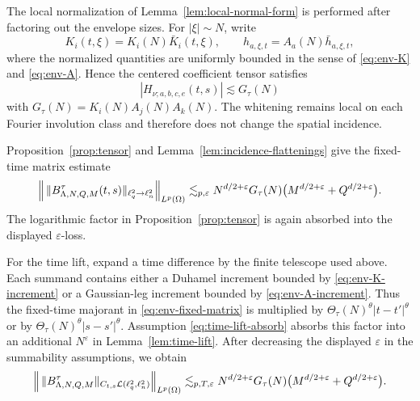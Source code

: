 \documentclass[11pt,reqno]{amsart}
\numberwithin{equation}{section}
\theoremstyle{plain}
\theoremstyle{definition}
\newcommand{\cL}{\mathcal L}
\newcommand{\eps}{\varepsilon}
\begin{document}
The local normalization of Lemma~\ref{lem:local-normal-form} is performed
after factoring out the envelope sizes.  For \(|\xi|\sim N\), write
\[
        K_i(t,\xi)=K_i(N)\bar K_i(t,\xi),
        \qquad
        h_{a,\xi,t}=A_a(N)\bar h_{a,\xi,t},
\]
where the normalized quantities are uniformly bounded in the sense of \eqref{eq:env-K} and \eqref{eq:env-A}.  Hence the centered coefficient tensor satisfies
\begin{equation}\label{eq:env-H-bound}
        |H_{\nu;a,b,c,e}(t,s)|
        \lesssim G_\tau(N)
\end{equation}
with \(G_\tau(N)=K_i(N)A_j(N)A_k(N)\).  The whitening remains local on each Fourier involution class and therefore does not change the spatial incidence.

Proposition~\ref{prop:tensor} and Lemma~\ref{lem:incidence-flattenings}
give the fixed-time matrix estimate
\begin{equation}\label{eq:env-fixed-matrix}
\Bigl\|\,\|B_{\Lambda,N,Q,M}^\tau(t,s)\|_{\ell_q^2\to\ell_n^2}\Bigr\|_{L^p(\Omega)}
\lesssim_{p,\eps}
        N^{d/2+\eps}G_\tau(N)
        \bigl(M^{d/2+\eps}+Q^{d/2+\eps}\bigr).
\end{equation}
The logarithmic factor in Proposition~\ref{prop:tensor} is again absorbed into the displayed \(\eps\)-loss.

For the time lift, expand a time difference by the finite telescope used
above.  Each summand contains either a Duhamel increment bounded by
\eqref{eq:env-K-increment} or a Gaussian-leg increment bounded by
\eqref{eq:env-A-increment}.  Thus the fixed-time majorant in
\eqref{eq:env-fixed-matrix} is multiplied by
\(\Theta_\tau(N)^\theta |t-t'|^\theta\) or by
\(\Theta_\tau(N)^\theta |s-s'|^\theta\).  Assumption
\eqref{eq:time-lift-absorb} absorbs this factor into an additional
\(N^\eps\) in Lemma~\ref{lem:time-lift}.  After decreasing the displayed
\(\eps\) in the summability assumptions, we obtain
\begin{equation}\label{eq:env-time-matrix}
\Bigl\|\,\|B_{\Lambda,N,Q,M}^\tau\|_{C_{t,s}\cL(\ell_q^2,\ell_n^2)}\Bigr\|_{L^p(\Omega)}
\lesssim_{p,T,\eps}
        N^{d/2+\eps}G_\tau(N)
        \bigl(M^{d/2+\eps}+Q^{d/2+\eps}\bigr).
\end{equation}
\end{document}
